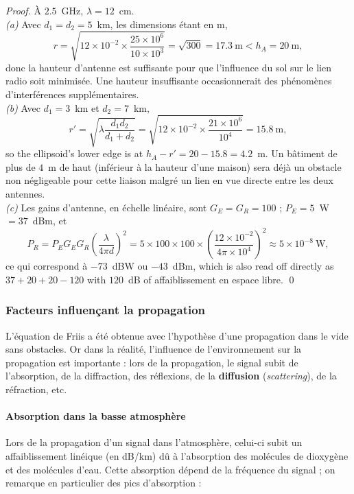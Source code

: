 \begin{proof}
  À $2.5$~GHz, $\lambda = 12$~cm.\\

  \emph{(a)} Avec $d_1 = d_2 = 5$~km, les dimensions étant en m,
  \[ r = \sqrt{12 \times 10^{-2} \times \frac{25 \times 10^{6}}{10 \times 10^{3}}}
       = \sqrt{300} = 17.3\ \mathrm{m} < h_A = 20\ \mathrm{m}, \]
  donc la hauteur d'antenne est suffisante pour que l'influence du sol sur le
  lien radio soit minimisée. Une hauteur insuffisante occasionnerait des
  phénomènes d'interférences supplémentaires.\\

  \emph{(b)} Avec $d_1 = 3$~km et $d_2 = 7$~km,
  \[ r' = \sqrt{\lambda \frac{d_1 d_2}{d_1+d_2}}
        = \sqrt{12 \times 10^{-2} \times \frac{21 \times 10^{6}}{10^{4}}} = 15.8\ \mathrm{m}, \]
  so the ellipsoid's lower edge is at $h_A - r' = 20 - 15.8 = 4.2$~m. Un
  bâtiment de plus de $4$~m de haut (inférieur à la hauteur d'une maison) sera
  déjà un obstacle non négligeable pour cette liaison malgré un lien en vue
  directe entre les deux antennes.\\

  \emph{(c)} Les gains d'antenne, en échelle linéaire, sont
  $G_E = G_R = 100$ ; $P_E = 5$~W $= 37$~dBm, et
  \[ P_R = P_E G_E G_R \left(\frac{\lambda}{4\pi d}\right)^2
    = 5 \times 100 \times 100 \times \left(\frac{12 \times 10^{-2}}{4\pi \times 10^{4}}\right)^{2}
    \approx 5 \times 10^{-8}\ \mathrm{W}, \]
  ce qui correspond à $-73$~dBW ou $-43$~dBm, which is also read off directly
  as $37 + 20 + 20 - 120$ with $120$~dB of affaiblissement en espace libre.
  \qed
\end{proof}

\subsubsection{Facteurs influençant la propagation}

L'équation de Friis a été obtenue avec l'hypothèse d'une propagation dans le
vide sans obstacles. Or dans la réalité, l'influence de l'environnement sur la
propagation est importante : lors de la propagation, le signal subit de
l'absorption, de la diffraction, des réflexions, de la \textbf{diffusion}
(\textit{scattering}), de la réfraction, etc.

\paragraph{Absorption dans la basse atmosphère} Lors de la propagation d'un
signal dans l'atmosphère, celui-ci subit un affaiblissement linéique (en dB/km)
dû à l'absorption des molécules de dioxygène et des molécules d'eau. Cette
absorption dépend de la fréquence du signal ; on remarque en particulier des
pics d'absorption :

